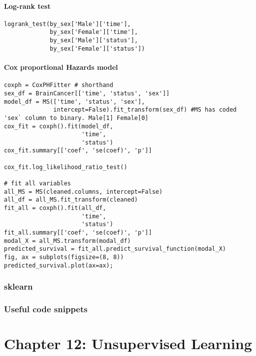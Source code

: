 \documentclass[
  letterpaper,
  DIV=11,
  numbers=noendperiod]{scrreprt}
\begin{document}
\subsubsection{Log-rank test}\label{log-rank-test}

\begin{verbatim}
logrank_test(by_sex['Male']['time'],
             by_sex['Female']['time'],
             by_sex['Male']['status'],
             by_sex['Female']['status'])
\end{verbatim}

\subsubsection{Cox proportional Hazards
model}\label{cox-proportional-hazards-model}

\begin{verbatim}
coxph = CoxPHFitter # shorthand
sex_df = BrainCancer[['time', 'status', 'sex']]
model_df = MS(['time', 'status', 'sex'],
              intercept=False).fit_transform(sex_df) #MS has coded 'sex` column to binary. Male[1] Female[0]
cox_fit = coxph().fit(model_df,
                      'time',
                      'status')
cox_fit.summary[['coef', 'se(coef)', 'p']]

cox_fit.log_likelihood_ratio_test()

# fit all variables
all_MS = MS(cleaned.columns, intercept=False)
all_df = all_MS.fit_transform(cleaned)
fit_all = coxph().fit(all_df,
                      'time',
                      'status')
fit_all.summary[['coef', 'se(coef)', 'p']]
modal_X = all_MS.transform(modal_df)
predicted_survival = fit_all.predict_survival_function(modal_X)
fig, ax = subplots(figsize=(8, 8))
predicted_survival.plot(ax=ax);
\end{verbatim}

\subsection{sklearn}\label{sklearn-7}

\subsection{Useful code snippets}\label{useful-code-snippets-4}


\chapter{Chapter 12: Unsupervised
Learning}\label{chapter-12-unsupervised-learning}
\end{document}
